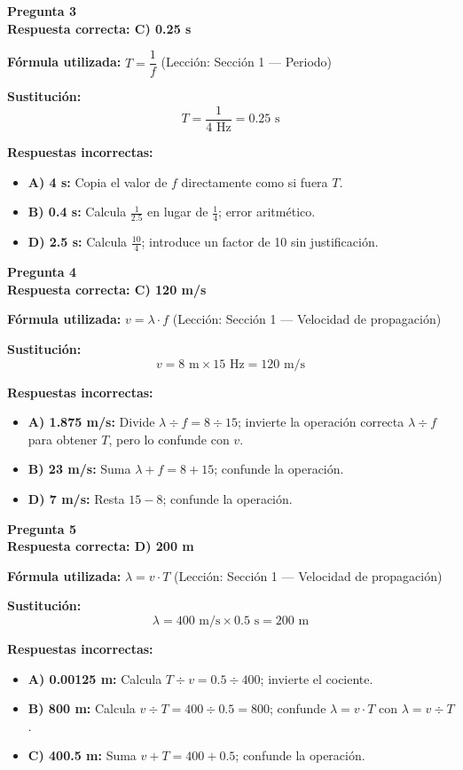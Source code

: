 \begin{respuestabox}
\textbf{Pregunta 3}\\
\textcolor{verdecorrecto}{\textbf{Respuesta correcta: C) 0.25 s}}

\textbf{Fórmula utilizada:} $T = \dfrac{1}{f}$ (Lección: Sección 1 — Periodo)

\textbf{Sustitución:}
$$T = \frac{1}{4 \text{ Hz}} = 0.25 \text{ s}$$

\textbf{Respuestas incorrectas:}
\begin{itemize}
    \item \textbf{A) 4 s:} Copia el valor de $f$ directamente como si fuera $T$.
    \item \textbf{B) 0.4 s:} Calcula $\frac{1}{2.5}$ en lugar de $\frac{1}{4}$; error aritmético.
    \item \textbf{D) 2.5 s:} Calcula $\frac{10}{4}$; introduce un factor de 10 sin justificación.
\end{itemize}
\end{respuestabox}
\newpage
\begin{respuestabox}
\textbf{Pregunta 4}\\
\textcolor{verdecorrecto}{\textbf{Respuesta correcta: C) 120 m/s}}

\textbf{Fórmula utilizada:} $v = \lambda \cdot f$ (Lección: Sección 1 — Velocidad de propagación)

\textbf{Sustitución:}
$$v = 8 \text{ m} \times 15 \text{ Hz} = 120 \text{ m/s}$$

\textbf{Respuestas incorrectas:}
\begin{itemize}
    \item \textbf{A) 1.875 m/s:} Divide $\lambda \div f = 8 \div 15$; invierte la operación correcta $\lambda \div f$ para obtener $T$, pero lo confunde con $v$.
    \item \textbf{B) 23 m/s:} Suma $\lambda + f = 8 + 15$; confunde la operación.
    \item \textbf{D) 7 m/s:} Resta $15 - 8$; confunde la operación.
\end{itemize}
\end{respuestabox}

\begin{respuestabox}
\textbf{Pregunta 5}\\
\textcolor{verdecorrecto}{\textbf{Respuesta correcta: D) 200 m}}

\textbf{Fórmula utilizada:} $\lambda = v \cdot T$ (Lección: Sección 1 — Velocidad de propagación)

\textbf{Sustitución:}
$$\lambda = 400 \text{ m/s} \times 0.5 \text{ s} = 200 \text{ m}$$

\textbf{Respuestas incorrectas:}
\begin{itemize}
    \item \textbf{A) 0.00125 m:} Calcula $T \div v = 0.5 \div 400$; invierte el cociente.
    \item \textbf{B) 800 m:} Calcula $v \div T = 400 \div 0.5 = 800$; confunde $\lambda = v \cdot T$ con $\lambda = v \div T$.
    \item \textbf{C) 400.5 m:} Suma $v + T = 400 + 0.5$; confunde la operación.
\end{itemize}
\end{respuestabox}

